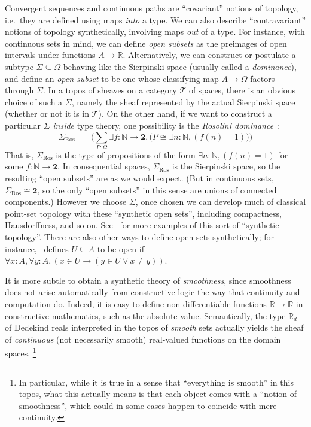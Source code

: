 \documentclass[10pt]{article}
\def\N{\mathbb{N}}
\def\R{\mathbb{R}}
\def\T{\mathcal{T}}
\def\bool{\mathbf{2}}
\numberwithin{equation}{section}
\begin{document}
Convergent sequences and continuous paths are ``covariant'' notions of topology, i.e.\ they are defined using maps \emph{into} a type.
We can also describe ``contravariant'' notions of topology synthetically, involving maps \emph{out} of a type.
For instance, with continuous sets in mind, %
we can define \emph{open subsets} as the preimages of open intervals under functions $A\to\R$.
%
Alternatively, we can construct or postulate a subtype $\Sigma\subseteq\Omega$ behaving like the Sierpinski space (usually called a \emph{dominance}), and define an \emph{open subset} to be one whose classifying map $A\to\Omega$ factors through $\Sigma$.
In a topos of sheaves on a category $\T$ of spaces, there is an obvious choice of such a $\Sigma$, namely the sheaf represented by the actual Sierpinski space (whether or not it is in $\T$).
On the other hand, if we want to construct a particular $\Sigma$ \emph{inside} type theory, one possibility is the \emph{Rosolini dominance}~\cite{rosolini:dominance}:
\[ \Sigma_{\mathrm{Ros}} \;=\; \Big(\textstyle\sum_{P:\Omega} \exists f:\N\to\bool, \Big(P \cong \exists n:\N, (f(n)=1)\Big)\Big) \]
That is, $\Sigma_{\mathrm{Ros}}$ is the type of propositions of the form $\exists n:\N, (f(n)=1)$ for some $f:\N\to\bool$.
In consequential spaces, $\Sigma_{\mathrm{Ros}}$ is the Sierpinski space, so the resulting ``open subsets'' are as we would expect.
(But in continuous sets, $\Sigma_{\mathrm{Ros}} \cong \bool$, so the only ``open subsets'' in this sense are unions of connected components.)
However we choose $\Sigma$, once chosen we can develop much of classical point-set topology with these ``synthetic open sets'', including compactness, Hausdorffness, and so on.
See~\cite{escardo:syntop-datatypes,escardo:top-hoil,taylor:lamcra,bl:met-syntop} for more examples of this sort of ``synthetic topology''.
There are also other ways to define open sets synthetically; for instance,~\cite{penon:thesis} defines $U\subseteq A$ to be open if $\forall x:A,\forall y:A, (x\in U \to (y\in U \lor x\neq y))$.

It is more subtle to obtain a synthetic theory of \emph{smoothness}, since smoothness does not arise automatically from constructive logic the way that continuity and computation do.
Indeed, it is easy to define non-differentiable functions $\R\to\R$ in constructive mathematics, such as the absolute value.
Semantically, the type $\R_d$ of Dedekind reals interpreted in the topos of \emph{smooth} sets actually yields the sheaf of \emph{continuous} (not necessarily smooth) real-valued functions on the domain spaces.%
\footnote{In particular, while it is true in a sense that ``everything is smooth'' in this topos, what this actually means is that each object comes with a ``notion of smoothness'', which could in some cases happen to coincide with mere continuity.}
\end{document}
